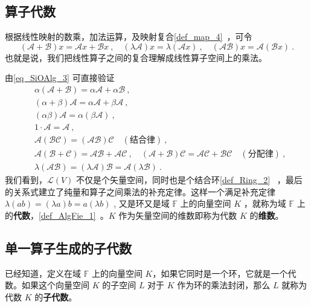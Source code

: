 

\subsection{算子代数}
根据线性映射的数乘，加法运算，及映射复合\autoref{def_map_4}~，可令
\begin{equation}\label{eq_SiOAlg_3}
(\mathcal{A}+\mathcal{B}) x=\mathcal{A} x+\mathcal{B} x~,\quad (\lambda\mathcal A) x=\lambda(\mathcal A x)~,\quad (\mathcal{AB}) x=\mathcal{A}(\mathcal{B} x)~.
\end{equation}
也就是说，我们把线性算子之间的复合理解成线性算子空间上的乘法。

由\autoref{eq_SiOAlg_3} 可直接验证
\begin{equation}
\begin{aligned}
&\alpha(\mathcal{A+B})=\alpha\mathcal{A}+\alpha\mathcal{B}~,\\
&(\alpha+\beta)\mathcal{A}=\alpha\mathcal{A}+\beta\mathcal{A}~,\\
&(\alpha\beta)\mathcal{A}=\alpha(\beta\mathcal{A})~,\\
&1\cdot \mathcal{A}=\mathcal A~,\\
&\mathcal{A}(\mathcal{BC})=(\mathcal{AB})\mathcal C\quad(\text{结合律})~,\\
&\mathcal A(\mathcal{B+C})=\mathcal{AB+AC}~,\quad (\mathcal{A+B})\mathcal C=\mathcal{AC+BC}\quad(\text{分配律})~,\\
&\lambda(\mathcal{AB})=(\lambda\mathcal{A})\mathcal{B}=\mathcal{A}(\lambda \mathcal B)~.
\end{aligned}
\end{equation}
我们看到，$\mathcal{L}(V)$ 不仅是个矢量空间，同时也是个结合环\autoref{def_Ring_2}~ ，最后的关系式建立了纯量和算子之间乘法的补充定律。这样一个满足补充定律 $\lambda(ab)=(\lambda a)b=a(\lambda b)$ , 又是环又是域 $\mathbb{F}$ 上的向量空间 $K$ ，就称为域 $\mathbb{F}$ 上的\textbf{代数}，\autoref{def_AlgFie_1}~。$K$ 作为矢量空间的维数即称为代数 $K$ 的\textbf{维数}。


\subsection{单一算子生成的子代数}

已经知道，定义在域 $\mathbb{F}$ 上的向量空间 $K$，如果它同时是一个环，它就是一个代数。如果这个向量空间 $K$ 的子空间 $L$ 对于 $K$ 作为环的乘法封闭，那么 $L$ 就称为代数 $K$ 的\textbf{子代数}。

